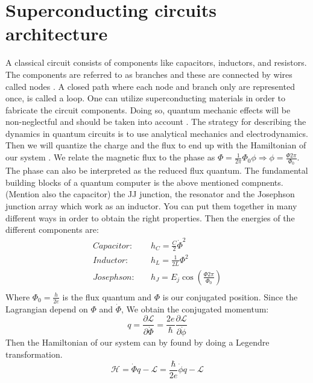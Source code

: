 \section{Superconducting circuits architecture}
    A classical circuit consists of components like capacitors, inductors, and resistors. The components are referred to as branches and these are connected by wires called nodes \cite{Griffiths2018}. A closed path where each node and branch only are represented once, is called a loop. One can utilize superconducting materials in order to fabricate the circuit components. Doing so, quantum mechanic effects will be non-neglectful and should be taken into account \cite{Girvin2014}. The strategy for describing the dynamics in quantum circuits is to use analytical mechanics and electrodynamics. Then we will quantize the charge and the flux to end up with the Hamiltonian of our system \cite{Krantz2019}. We relate the magnetic flux to the phase as  $\Phi= \frac{1}{2\pi}\Phi_{0} \phi \Rightarrow \phi = \frac{\Phi 2 \pi}{\Phi_0}$. The phase can also be interpreted as the reduced flux quantum. The fundamental building blocks of a quantum computer is the above mentioned compnents. (Mention also the capacitor) the JJ junction, the resonator and the Josephson junction array which work as an inductor. You can put them together in many different ways in order to obtain the right properties.  Then the energies of the different components are: 
    \begin{equation}
        \begin{aligned}
            Capacitor:& \quad h_C  = \frac{C}{2} \Dot{\Phi}^2     \\ 
            Inductor:& \quad h_L = \frac{1}{2 L} \Phi^2    \\
            Josephson:& \quad h_{J} = E_j \cos \left(\frac{\Phi 2 \pi}{\Phi_0} \right)    \\
        \end{aligned}
    \end{equation}
    Where $\Phi_{0}=\frac{h}{2e}$ is the flux quantum and $\Phi$ is our conjugated position. Since the Lagrangian depend on $\Phi$ and $\Dot{\Phi}$, We obtain the conjugated momentum:
    \begin{equation}
        q = \frac{\partial \mathcal{L}}{\partial \dot{\Phi}} = \frac{2 e}{\hbar} \frac{\partial \mathcal{L}}{\partial \dot{\phi}}
    \end{equation}
    Then the Hamiltonian of our system can by found by doing a Legendre transformation.
    \begin{equation}
        \mathcal{H}  =\dot{\Phi} q-\mathcal{L}=\frac{\hbar}{2 e} \dot{\phi} q-\mathcal{L}
    \end{equation}
